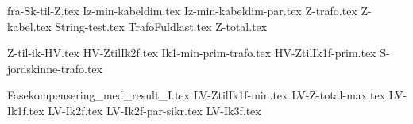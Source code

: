 \usepackage[utf8]{inputenc}%
\usepackage{amsmath}%
\usepackage{mathtools}%
\usepackage{icomma}%
\usepackage{siunitx}%
\usepackage{fp}%
\usepackage{xstring}%
\usepackage{listofitems}
\usepackage{ifthen}
\usepackage{gensymb} %
\usepackage{import} %

{fra-Sk-til-Z.tex}
{Iz-min-kabeldim.tex}
{Iz-min-kabeldim-par.tex}
{Z-trafo.tex}
{Z-kabel.tex}
{String-test.tex}
{TrafoFuldlast.tex}
{Z-total.tex}

{Z-til-ik-HV.tex}
{HV-ZtilIk2f.tex}
{Ik1-min-prim-trafo.tex}
{HV-ZtilIk1f-prim.tex}
{S-jordskinne-trafo.tex}

{Fasekompensering_med_result_I.tex}
{LV-ZtilIk1f-min.tex}
{LV-Z-total-max.tex}
{LV-Ik1f.tex}
{LV-Ik2f.tex}
{LV-Ik2f-par-sikr.tex}
{LV-Ik3f.tex}